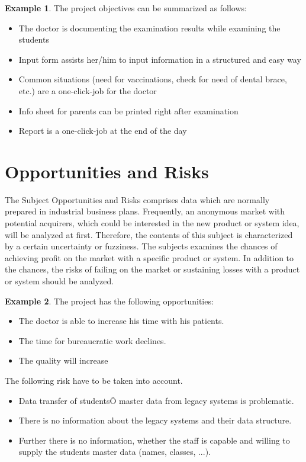 \documentclass[12pt]{article}
\theoremstyle{definition}
\newtheorem{example}{Example}
\newenvironment{explanation}{%
   \setlength{\parindent}{0pt}
   \itshape
   \color{blue}
}{}
\begin{document}
\begin{example}
The project objectives can be summarized as follows:
\begin{itemize}
\item The doctor is documenting the examination results while examining the students
\item Input form assists her/him to input information in a structured and easy way
\item Common situations (need for vaccinations, check for need of dental brace, etc.) are a one-click-job for the doctor
\item Info sheet for parents can be printed right after examination
\item Report is a one-click-job at the end of the day
\end{itemize}
\end{example}

\pagebreak
\section{Opportunities and Risks}
\begin{explanation}
The Subject Opportunities and Risks comprises data which are normally prepared in industrial business plans. Frequently, an anonymous market with potential acquirers, which could be interested in the new product or system idea, will be analyzed at first. Therefore, the contents of this subject is characterized by a certain uncertainty or fuzziness. The subjects examines the chances of achieving profit on the market with a specific product or system. In addition to the chances, the risks of failing on the market or sustaining losses with a product or system should be analyzed.
\end{explanation}

\begin{example}
The project has the following opportunities:
\begin{itemize}
\item The doctor is able to increase his time with his patients.
\item The time for bureaucratic work declines.
\item The quality will increase
\end{itemize}

The following risk have to be taken into account.
\begin{itemize}
\item Data transfer of studentsÕ master data from legacy systems is problematic.
\item There is no information about the legacy systems and their data structure.
\item Further there is no information, whether the staff is capable and willing to supply the students master data (names, classes, ...).
\end{itemize}

\end{example}
\end{document}
